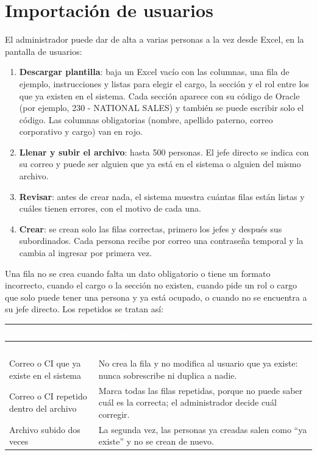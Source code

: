\documentclass[11pt,letterpaper]{article}
\newcommand{\cabecera}{\rowcolor{maxamPrimario}}
\newcommand{\tth}[1]{\textcolor{white}{\textbf{#1}}}
\begin{document}
\section{Importación de usuarios}
El administrador puede dar de alta a varias personas a la vez desde Excel, en la pantalla de usuarios:
\begin{enumerate}
  \item \textbf{Descargar plantilla}: baja un Excel vacío con las columnas, una fila de ejemplo, instrucciones y listas para elegir el cargo, la sección y el rol entre los que ya existen en el sistema. Cada sección aparece con su código de Oracle (por ejemplo, 230 - NATIONAL SALES) y también se puede escribir solo el código. Las columnas obligatorias (nombre, apellido paterno, correo corporativo y cargo) van en rojo.
  \item \textbf{Llenar y subir el archivo}: hasta 500 personas. El jefe directo se indica con su correo y puede ser alguien que ya está en el sistema o alguien del mismo archivo.
  \item \textbf{Revisar}: antes de crear nada, el sistema muestra cuántas filas están listas y cuáles tienen errores, con el motivo de cada una.
  \item \textbf{Crear}: se crean solo las filas correctas, primero los jefes y después sus subordinados. Cada persona recibe por correo una contraseña temporal y la cambia al ingresar por primera vez.
\end{enumerate}

Una fila no se crea cuando falta un dato obligatorio o tiene un formato incorrecto, cuando el cargo o la sección no existen, cuando pide un rol o cargo que solo puede tener una persona y ya está ocupado, o cuando no se encuentra a su jefe directo. Los repetidos se tratan así:

\begin{xltabular}{\textwidth}{L{4.6cm} Y}
\cabecera \tth{Caso} & \tth{Qué hace el sistema} \\
\endfirsthead
\cabecera \tth{Caso} & \tth{Qué hace el sistema} \\
\endhead
{} Correo o CI que ya existe en el sistema & No crea la fila y no modifica al usuario que ya existe: nunca sobrescribe ni duplica a nadie. \\
Correo o CI repetido dentro del archivo & Marca todas las filas repetidas, porque no puede saber cuál es la correcta; el administrador decide cuál corregir. \\
 Archivo subido dos veces & La segunda vez, las personas ya creadas salen como ``ya existe'' y no se crean de nuevo. \\
\end{xltabular}
\end{document}
